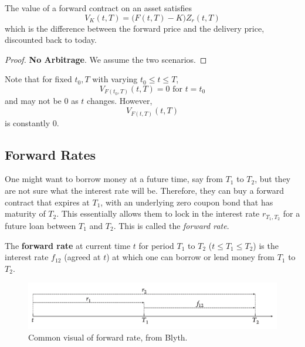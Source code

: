 \documentclass{article}
\begin{document}
    \begin{theorem}
      The value of a forward contract on an asset satisfies 
      \begin{equation}
        V_K (t, T) = \big( F(t, T) - K \big) Z_r (t, T)
      \end{equation}
      which is the difference between the forward price and the delivery price, discounted back to today. 
    \end{theorem}
    \begin{proof}
      \textbf{No Arbitrage}. We assume the two scenarios.
    \end{proof}

    Note that for fixed $t_0, T$ with varying $t_0 \leq t \leq T$,  
    \begin{equation}
      V_{F(t_0, T)} (t, T) = 0 \text{ for } t = t_0
    \end{equation}
    and may not be $0$ as $t$ changes. However, 
    \begin{equation}
      V_{F(t, T)} (t, T)
    \end{equation}
    is constantly $0$. 

  \subsection{Forward Rates}

    One might want to borrow money at a future time, say from $T_1$ to $T_2$, but they are not sure what the interest rate will be. Therefore, they can buy a forward contract that expires at $T_1$, with an underlying zero coupon bond that has maturity of $T_2$. This essentially allows them to lock in the interest rate $r_{T_1, T_2}$ for a future loan between $T_1$ and $T_2$. This is called the \textit{forward rate}. 

    \begin{definition}
      The \textbf{forward rate} at current time $t$ for period $T_1$ to $T_2$ ($t \leq T_1 \leq T_2$) is the interest rate $f_{12}$ (agreed at $t$) at which one can borrow or lend money from $T_1$ to $T_2$. 

      \begin{figure}[H]
        \centering 
        \includegraphics[scale=0.35]{img/forward_zero_rates.png}
        \caption{Common visual of forward rate, from Blyth.}
        \label{fig:forward_zero_rates}
      \end{figure}
    \end{definition}
\end{document}
